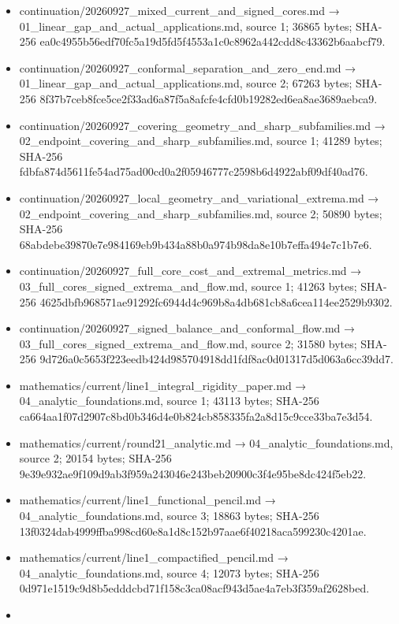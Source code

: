 \documentclass[
  10pt,
]{article}
\providecommand{\tightlist}{%
  \setlength{\itemsep}{0pt}\setlength{\parskip}{0pt}}
\begin{document}
\begin{itemize}
\tightlist
\item
  continuation/20260927\_mixed\_current\_and\_signed\_cores.md →
  01\_linear\_gap\_and\_actual\_applications.md, source 1; 36865 bytes;
  SHA-256
  ea0c4955b56edf70fc5a19d5fd5f4553a1c0c8962a442cdd8c43362b6aabcf79.
\item
  continuation/20260927\_conformal\_separation\_and\_zero\_end.md →
  01\_linear\_gap\_and\_actual\_applications.md, source 2; 67263 bytes;
  SHA-256
  8f37b7ceb8fce5ce2f33ad6a87f5a8afcfe4cfd0b19282ed6ea8ae3689aebca9.
\item
  continuation/20260927\_covering\_geometry\_and\_sharp\_subfamilies.md
  → 02\_endpoint\_covering\_and\_sharp\_subfamilies.md, source 1; 41289
  bytes; SHA-256
  fdbfa874d5611fe54ad75ad00cd0a2f05946777c2598b6d4922abf09df40ad76.
\item
  continuation/20260927\_local\_geometry\_and\_variational\_extrema.md →
  02\_endpoint\_covering\_and\_sharp\_subfamilies.md, source 2; 50890
  bytes; SHA-256
  68abdebe39870e7e984169eb9b434a88b0a974b98da8e10b7effa494e7c1b7e6.
\item
  continuation/20260927\_full\_core\_cost\_and\_extremal\_metrics.md →
  03\_full\_cores\_signed\_extrema\_and\_flow.md, source 1; 41263 bytes;
  SHA-256
  4625dbfb968571ae91292fc6944d4c969b8a4db681cb8a6cea114ee2529b9302.
\item
  continuation/20260927\_signed\_balance\_and\_conformal\_flow.md →
  03\_full\_cores\_signed\_extrema\_and\_flow.md, source 2; 31580 bytes;
  SHA-256
  9d726a0c5653f223eedb424d985704918dd1fdf8ac0d01317d5d063a6cc39dd7.
\item
  mathematics/current/line1\_integral\_rigidity\_paper.md →
  04\_analytic\_foundations.md, source 1; 43113 bytes; SHA-256
  ca664aa1f07d2907c8bd0b346d4e0b824cb858335fa2a8d15c9cce33ba7e3d54.
\item
  mathematics/current/round21\_analytic.md →
  04\_analytic\_foundations.md, source 2; 20154 bytes; SHA-256
  9e39e932ae9f109d9ab3f959a243046e243beb20900c3f4e95be8dc424f5eb22.
\item
  mathematics/current/line1\_functional\_pencil.md →
  04\_analytic\_foundations.md, source 3; 18863 bytes; SHA-256
  13f0324dab4999ffba998cd60e8a1d8c152b97aae6f40218aca599230c4201ae.
\item
  mathematics/current/line1\_compactified\_pencil.md →
  04\_analytic\_foundations.md, source 4; 12073 bytes; SHA-256
  0d971e1519c9d8b5edddcbd71f158c3ca08acf943d5ae4a7eb3f359af2628bed.
\item

\end{itemize}
\end{document}
